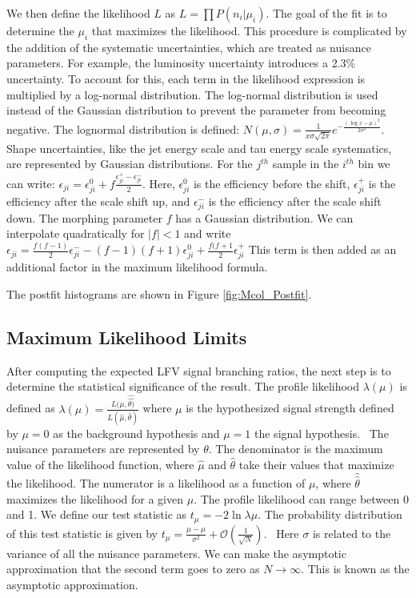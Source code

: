 \documentclass[oneside, letterpaper, oldfontcommands]{memoir}
\begin{document}
\qquad We then define the likelihood $L$ as $L =  \prod P(n_{i}|\mu_{i})$. The goal of the fit is to determine the $\mu_{i}$ that maximizes the likelihood. This procedure is complicated by the addition of the systematic uncertainties, which are treated as nuisance parameters. For example, the luminosity uncertainty introduces a  2.3\% uncertainty. To account for this, each term in the likelihood expression is multiplied by a log-normal distribution. The log-normal distribution is used instead of the Gaussian distribution to prevent the parameter from becoming negative. 
The lognormal distribution is defined: $N(\mu,\sigma) = \frac{1}{x\sigma \sqrt{2\pi}}e^{-\frac{(\log x - \mu)^{2}}{2\sigma^{2}}}$. 
Shape uncertainties, like the jet energy scale and tau energy scale systematics, are represented by Gaussian distributions. For the $j^{th}$ sample in the $i^{th}$ bin we can write: $\epsilon_{ji} = \epsilon_{ji}^{0} + f \frac{\epsilon_{ji}^{+} - \epsilon_{ji}^{-}}{2}$. Here, $\epsilon_{ji}^{0}$ is the efficiency before the shift, $\epsilon_{ji}^{+}$ is the efficiency after the scale shift up, and $\epsilon_{ji}^{-}$ is the efficiency after the scale shift down. 
The morphing parameter $f$ has a Gaussian distribution. We can interpolate quadratically for $|f|<1$ and write $\epsilon_{ji} = \frac{f (f-1)}{2} \epsilon_{ji}^{-} - (f - 1)(f + 1)\epsilon_{ji}^{0}+\frac{f(f+1}{2}\epsilon_{ji}^{+}$ This term is then added as an additional factor in the maximum likelihood formula. 

\qquad The postfit histograms are shown in Figure \ref{fig:Mcol_Postfit}. %
\subsection{Maximum Likelihood Limits}

\qquad After computing the expected LFV signal branching ratios, the next step is to determine the statistical significance of the result. The profile likelihood $\lambda(\mu)$ is defined as  $\lambda(\mu) = \frac{L(\mu,\hat{\hat{\theta)}}}{L(\hat{\mu},\hat{\theta})}$ where $\mu$ is the hypothesized signal strength defined by $\mu=0$ as the background hypothesis and $\mu=1$ the signal hypothesis.~\cite{Cowan:2010js} 
The nuisance parameters are represented by $\theta$. The denominator is the maximum value of the likelihood function, where $\hat{\mu}$ and $\hat{\theta}$ take their values that maximize the likelihood. The numerator is a likelihood as a function of $\mu$, where $\hat{\hat{\theta}}$ maximizes the likelihood for a given $\mu$. The profile likelihood can range between 0 and 1. 
We define our test statistic as $t_{\mu} = -2\ln\lambda\mu$. The probability distribution of this test statistic is given by $t_{\mu} = \frac{\mu-\hat{\mu}}{\sigma^2} + \mathcal{O}(\frac{1}{\sqrt{N}})$.~\cite{wald1943tests} 
Here $\sigma$ is related to the variance of all the nuisance parameters. We can make the asymptotic approximation that the second term goes to zero as $N \rightarrow \infty$. This is known as the asymptotic approximation.
\end{document}
